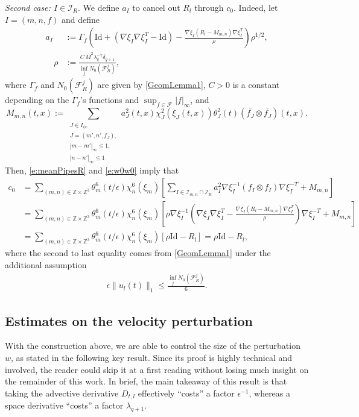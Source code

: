 \documentclass[10pt,a4paper]{amsart}
\numberwithin{equation}{section}
\numberwithin{corollario}{section}
\numberwithin{lemma}{section}
\numberwithin{prop}{section}
\theoremstyle{definition}
\theoremstyle{remark}
\newcommand{\Z}{\mathbb{Z}}
\newcommand{\F}{\mathcal{F}}
\newcommand{\I}{\mathcal{I}}
\newcommand{\Id}{\mathrm{Id}}
\newcommand{\qq}{_{q+1}}
\begin{document}
{\emph{Second case: $I \in \mathcal{I}_{R}$}}.
We define $a_I$ to cancel out $R_l$ through $c_0$. 
Indeed, let $I=(m,n,f)$ and define
\begin{align}\label{e:amplR}
a_I &:= \Gamma_f\left(\Id+(\nabla\xi_I\nabla\xi_I^T-\Id)-\frac{\nabla\xi_I(R_l-M_{m,n})\nabla\xi_I^T}{\rho}\right)\rho^{1/2}, \\
\quad 
\label{eq:definitio_rho}
\rho &:=\frac{C \,\overline{M}^2\lambda_q^{-\gamma}\delta_{q+1}}
{\inf_{j} N_0(\F_R^j)},
\end{align}
where $\Gamma_f$ and $N_0(\F_R^j)$ are given by \autoref{GeomLemma1}, $C>0$ is a constant depending on the $\Gamma_f$'s functions and $\sup_{f\in\F}|f|_\infty$, and
\begin{equation}\label{eq:M_mn}
    M_{m,n}(t,x):=\sum_{\substack{J\in I_{\phi},\\
    J=(m',n',f_J),\\
    |m-m'|_{\infty}\le 1,\\
    |n-n'|_{\infty}\le 1}}a_J^2(t,x)\chi_J^2(\xi_J(t,x))\theta_J^2(t)\left(\overline{f_J}\otimes\overline{f_J}\right)(t,x).
\end{equation}
Then, \eqref{e:meanPipesR} and \eqref{e:w0w0} imply that
\begin{equation}\label{e:cancW0W0}
    \begin{aligned}
        c_0
        &=
        \sum_{(m,n)\in \Z\times\Z^3}\theta_m^6(t/\epsilon)\chi_n^6(\xi_m )
        \left[\sum_{I\in\I_{m,n} \cap \mathcal{I}_R}a_I^2 \nabla\xi_I^{-1} (f_I\otimes f_I) \nabla\xi_I^{-T} +M_{m,n} \right]
        \\
        &=
        \sum_{(m,n)\in \Z\times\Z^3}\theta_m^6(t/\epsilon)\chi_n^6(\xi_m )
        \left[\rho\nabla\xi_I^{-1}\left(\nabla\xi_I\nabla\xi_I^T-\frac{\nabla\xi_I(R_l-M_{m,n})\nabla\xi_I^T}{\rho}\right)\nabla\xi_I^{-T}+M_{m,n}\right]
        \\
        &=
        \sum_{(m,n)\in \Z\times\Z^3}\theta_m^6(t/\epsilon)\chi_n^6(\xi_m )
        \left[\rho\Id-R_l\right]=\rho\Id-R_l,
    \end{aligned}
\end{equation}
where the second to last equality comes from \autoref{GeomLemma1} under the additional assumption 
\begin{align}
    \epsilon\|u_l(t)\|_1\le \frac{\inf_{j} N_0(\F_R^j)}6.
\end{align}

\subsection{Estimates on the velocity perturbation} \label{ssec:estimates_v}
With the construction above, we are able to control the size of the perturbation $w$, as stated in the following key result. Since its proof is highly technical and involved, the reader could skip it at a first reading without losing much insight on the remainder of this work.
In brief, the main takeaway of this result is that taking the advective derivative $D_{t,l}$ effectively ``costs'' a factor $\epsilon^{-1}$, whereas a space derivative ``costs'' a factor $\lambda\qq$.
 
\end{document}
